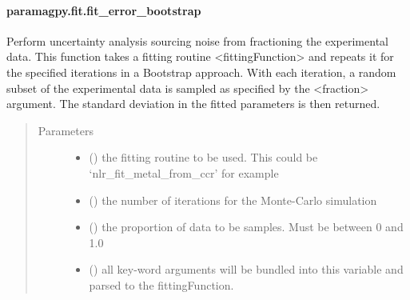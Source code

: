 \documentclass[a4paper,10pt,english,openany,oneside]{sphinxmanual}
\begin{document}
\paragraph{paramagpy.fit.fit\_error\_bootstrap}
\label{\detokenize{reference/generated/paramagpy.fit.fit_error_bootstrap:paramagpy-fit-fit-error-bootstrap}}\label{\detokenize{reference/generated/paramagpy.fit.fit_error_bootstrap::doc}}

\begin{fulllineitems}
\label{\detokenize{reference/generated/paramagpy.fit.fit_error_bootstrap:paramagpy.fit.fit_error_bootstrap}}
Perform uncertainty analysis sourcing noise from fractioning the
experimental data. This function takes a fitting routine \textless{}fittingFunction\textgreater{}
and repeats it for the specified iterations in a Bootstrap approach.
With each iteration, a random subset of the experimental data is sampled as
specified by the \textless{}fraction\textgreater{} argument. The standard deviation in the fitted
parameters is then returned.
\begin{quote}\begin{description}
\item[{Parameters}] \leavevmode\begin{itemize}
\item {} 
 () \textendash{} the fitting routine to be used.
This could be ‘nlr\_fit\_metal\_from\_ccr’ for example

\item {} 
 () \textendash{} the number of iterations for the Monte-Carlo simulation

\item {} 
 () \textendash{} the proportion of data to be samples. Must be between 0 and 1.0

\item {} 
 () \textendash{} all key-word arguments will be bundled into this variable and
parsed to the fittingFunction.


\end{itemize}
\end{description}
\end{quote}
\end{fulllineitems}
\end{document}
